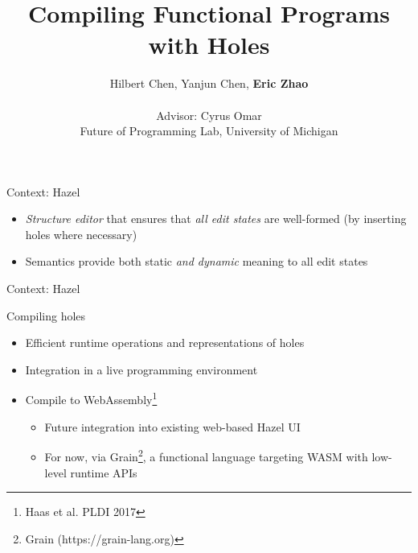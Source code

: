 \documentclass[xcolor={dvipsnames},xtable]{beamer}
\title{Compiling Functional Programs with Holes}
\subtitle{}
\author{Hilbert Chen, Yanjun Chen, \textbf{Eric Zhao} \\\\
Advisor: Cyrus Omar \\
Future of Programming Lab, University of Michigan}
\date{}
\begin{document}

\newcommand{\currenttitle}{}

\maketitle

\renewcommand{\currenttitle}{Context: Hazel}
\begin{frame}{\currenttitle}
  \begin{itemize}
    \item<+-> \emph{Structure editor} that ensures that \emph{all edit states} are well-formed (by
      inserting holes where necessary)
    \item<+-> Semantics provide both static \emph{and dynamic} meaning to all edit states
  \end{itemize}
\end{frame}

\begin{frame}{\currenttitle}

\end{frame}

\renewcommand{\currenttitle}{Compiling holes}
\begin{frame}{\currenttitle}
  \begin{itemize}
    \item<2-> Efficient runtime operations and representations of holes
    \item<3-> Integration in a live programming environment
    \item<4-> Compile to WebAssembly\footnote<4->{Haas et al. PLDI 2017} 
      \begin{itemize}
        \item Future integration into existing web-based Hazel UI
        \item For now, via Grain\footnote<3->{Grain (https://grain-lang.org)}, a functional language
          targeting WASM with low-level runtime APIs
      \end{itemize}
  \end{itemize}
\end{frame}
\end{document}
